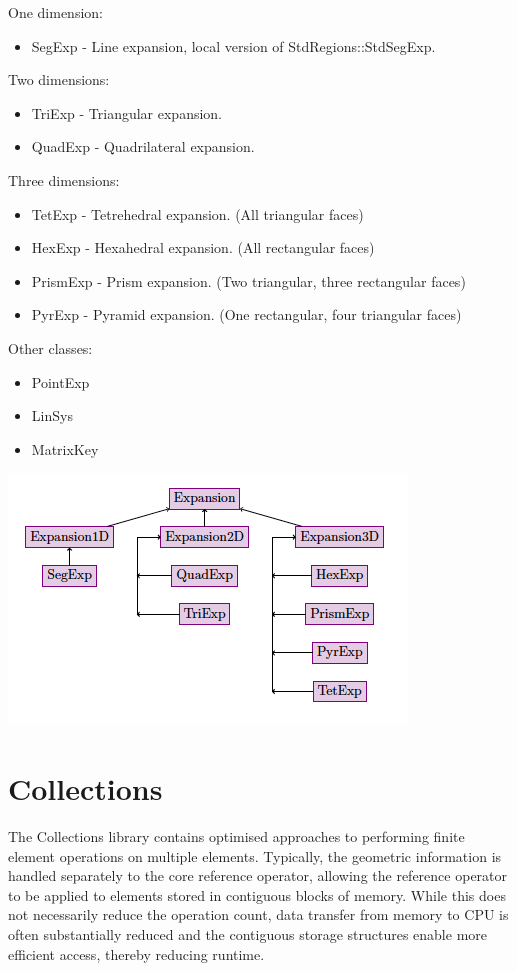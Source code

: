 One dimension:
\begin{itemize}
\item SegExp - Line expansion, local version of StdRegions::StdSegExp.
\end{itemize}

Two dimensions:
\begin{itemize}
\item TriExp - Triangular expansion.
\item QuadExp - Quadrilateral expansion.
\end{itemize}

Three dimensions:
\begin{itemize}
\item TetExp - Tetrehedral expansion. (All triangular faces) 
\item HexExp - Hexahedral expansion. (All rectangular faces)
\item PrismExp - Prism expansion. (Two triangular, three rectangular faces)
\item PyrExp - Pyramid expansion. (One rectangular, four triangular faces)
\end{itemize}

Other classes:
\begin{itemize}
\item PointExp
\item LinSys
\item MatrixKey
\end{itemize}

\begin{center}
\includegraphics{img/LocalRegions.png}
\end{center}

\section{Collections}
The Collections library contains optimised approaches to performing finite
element operations on multiple elements. Typically, the geometric information is
handled separately to the core reference operator, allowing the reference
operator to be applied to elements stored in contiguous blocks of memory. While
this does not necessarily reduce the operation count, data transfer from
memory to CPU is often substantially reduced and the contiguous storage
structures enable more efficient access, thereby reducing runtime.

